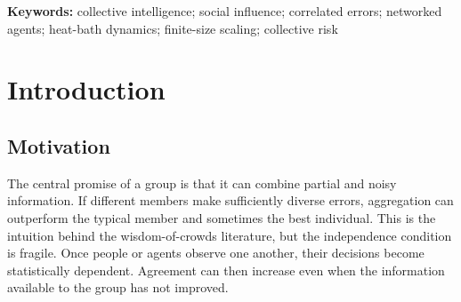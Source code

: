 \documentclass[11pt,a4paper]{article}
\begin{document}
\begin{abstract}
Communication is often introduced to help a population pool distributed evidence. It can also cause agents to reuse the same evidence and thereby convert a shared input error into a collective failure. This paper studies that trade-off in a stochastic binary-agent model with sparse communication, controlled private-signal quality, and crossed shared-input correlation. In the reduced confirmation experiment at $N=256$, $T=200$, $q=0.55$, and $\rho_{\mathrm{in}}=0.25$, strong communication ($J=3$) produced near-consensus (agreement $=0.994$) but low mean individual accuracy ($=0.401$) and high severe-failure risk ($=0.60$). The matched independent-input condition reached accuracy $=0.946$ with severe-failure risk $=0.05$. In a separate, lower-replication terminal-error experiment, strong coupling reduced the effective population size to approximately one, indicating that additional agents contributed little independent error cancellation at the terminal time. A smaller-population replication and a four-family topology screen preserved the broad contrast, although the replication did not reproduce a negative paired accuracy change in every cell. Approximate-equilibrium checks on a complete graph showed increasing ordering in a coupling window containing the analytic mean-field scale but did not resolve finite-size scaling. The results therefore support a finite-horizon communication--correlation mechanism and motivate stronger population-size and mixing studies; they do not establish a thermodynamic phase transition.
\end{abstract}

\vspace{0.25em}
\noindent\textbf{Keywords:} collective intelligence; social influence; correlated errors; networked agents; heat-bath dynamics; finite-size scaling; collective risk

\section{Introduction}

\subsection{Motivation}

The central promise of a group is that it can combine partial and noisy information. If different members make sufficiently diverse errors, aggregation can outperform the typical member and sometimes the best individual. This is the intuition behind the wisdom-of-crowds literature, but the independence condition is fragile. Once people or agents observe one another, their decisions become statistically dependent. Agreement can then increase even when the information available to the group has not improved.
\end{document}
